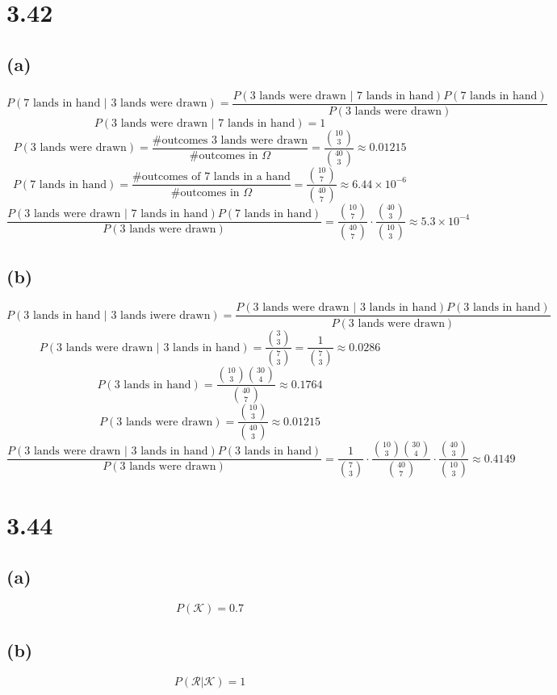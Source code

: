 \documentclass[11pt]{article}
\begin{document}
\section*{3.42}
\subsection*{(a)}
\[P(\text{7 lands in hand }|\text{ 3 lands were drawn})=\frac{P(\text{3 lands were drawn }|\text{ 7 lands in hand})P(\text{7 lands in hand})}{P(\text{3 lands were drawn})}\]
\[P(\text{3 lands were drawn }|\text{ 7 lands in hand})=1\]
\[P(\text{3 lands were drawn})=\frac{\text{\# outcomes 3 lands were drawn}}{\text{\# outcomes in }\Omega}=\frac{\binom{10}{3}}{\binom{40}{3}}\approx 0.01215\]
\[P(\text{7 lands in hand})=\frac{\text{\# outcomes of 7 lands in a hand}}{\text{\# outcomes in }\Omega}=\frac{\binom{10}{7}}{\binom{40}{7}}\approx6.44\times10^{-6}\]
\[\frac{P(\text{3 lands were drawn }|\text{ 7 lands in hand})P(\text{7 lands in hand})}{P(\text{3 lands were drawn})}=\frac{\binom{10}{7}}{\binom{40}{7}}\cdot\frac{\binom{40}{3}}{\binom{10}{3}}\approx5.3\times10^{-4}\]
\subsection*{(b)}
\[P(\text{3 lands in hand }|\text{ 3 lands iwere drawn})=\frac{P(\text{3 lands were drawn }|\text{ 3 lands in hand})P(\text{3 lands in hand})}{P(\text{3 lands were drawn})}\]
\[P(\text{3 lands were drawn }|\text{ 3 lands in hand})=\frac{\binom{3}{3}}{\binom{7}{3}}=\frac{1}{\binom{7}{3}}\approx0.0286\]
\[P(\text{3 lands in hand})=\frac{\binom{10}{3}\binom{30}{4}}{\binom{40}{7}}\approx0.1764\]
\[P(\text{3 lands were drawn})=\frac{\binom{10}{3}}{\binom{40}{3}}\approx0.01215\]
\[\frac{P(\text{3 lands were drawn }|\text{ 3 lands in hand})P(\text{3 lands in hand})}{P(\text{3 lands were drawn})}=\frac{1}{\binom{7}{3}}\cdot\frac{\binom{10}{3}\binom{30}{4}}{\binom{40}{7}}\cdot\frac{\binom{40}{3}}{\binom{10}{3}}\approx0.4149\]
\clearpage
\section*{3.44}
\subsection*{(a)}
\[P(\mathcal{K})=0.7\]
\subsection*{(b)}
\[P(\mathcal{R}|\mathcal{K})=1\]
\end{document}
